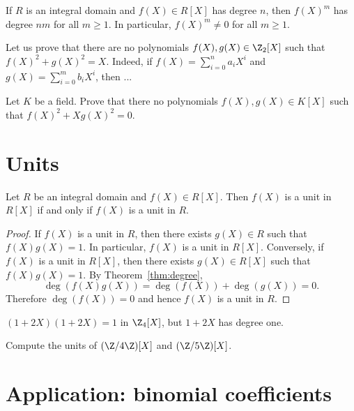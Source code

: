 \documentclass[12pt]{amsproc}
\begin{document}
\begin{example}
If $R$ is an integral domain and $f(X)\in R[X]$ 
has degree $n$, then $f(X)^m$ has degree $nm$ for all $m\ge 1$. In particular, $f(X)^m\neq 0$ for all $m\ge 1$.
\end{example} 

\begin{example}
    Let us prove that there are no polynomials $f(X),g(X)\in \Z_2[X]$ such that 
    $f(X)^2+g(X)^2=X$. Indeed, if $f(X)=\sum_{i=0}^n a_iX^i$ and $g(X)=\sum_{i=0}^m b_iX^i$, then
    ...
\end{example}

\begin{exercise}
    Let $K$ be a field. Prove that there no polynomials $f(X),g(X)\in K[X]$ such that 
    $f(X)^2+Xg(X)^2=0$.
\end{exercise}

\section{Units} 

\begin{proposition}
    Let $R$ be an integral domain and $f(X)\in R[X]$. Then $f(X)$ is a unit in $R[X]$ if and only if $f(X)$ is a unit in $R$.
\end{proposition}

\begin{proof}
    If $f(X)$ is a unit in $R$, then there exists $g(X)\in R$ such that $f(X)g(X)=1$. In particular, $f(X)$ is a unit in $R[X]$. 
    Conversely, if $f(X)$ is a unit in $R[X]$, then there exists $g(X)\in R[X]$ such that $f(X)g(X)=1$. By Theorem~\ref{thm:degree}, 
    \[ 
    \deg(f(X)g(X))=\deg(f(X))+\deg(g(X))=0.
    \] 
    Therefore $\deg(f(X))=0$ and hence $f(X)$ is a unit in $R$.
\end{proof}

\begin{example}
    $(1+2X)(1+2X)=1$ in $\Z_4[X]$, but $1+2X$ has degree one.
\end{example}

\begin{exercise}
    Compute the units of $(\Z/4\Z)[X]$ and $(\Z/5\Z)[X]$.
\end{exercise}

\section{Application: binomial coefficients}
\end{document}
